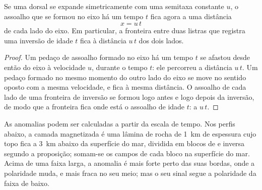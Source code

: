 \begin{proposition}\label{prop:g11:drift-to-spreading:stripe}
Se uma dorsal se expande simetricamente com uma semitaxa constante $u$, o
assoalho que se formou no eixo há um tempo $t$ fica agora a uma distância
\[
  x = u\,t
\]
de cada lado do eixo. Em particular, a fronteira entre duas listras que
registra uma inversão de idade $t$ fica à distância $u\,t$ dos dois lados.
\end{proposition}

\begin{proof}
Um pedaço de assoalho formado no eixo há um tempo $t$ se afastou desde então
do eixo à velocidade $u$, durante o tempo $t$: ele percorreu a distância
$u\,t$. Um pedaço formado no mesmo momento do outro lado do eixo se move no
sentido oposto com a mesma velocidade, e fica à mesma distância. O assoalho
de cada lado de uma fronteira de inversão se formou logo antes e logo depois
da inversão, de modo que a fronteira fica onde está o assoalho de idade $t$:
a $u\,t$.
\end{proof}

As anomalias podem ser calculadas a partir da escala de tempo. Nos perfis
abaixo, a camada magnetizada é uma lâmina de rocha de \qty{1}{km} de
espessura cujo topo fica a \qty{3}{km} abaixo da superfície do mar, dividida
em blocos de  e inversa segundo a proposição; somam-se os
campos de cada bloco na superfície do mar. Acima de uma faixa larga, a
anomalia é mais forte perto das suas bordas, onde a polaridade muda, e mais
fraca no seu meio; mas o seu sinal segue a polaridade da faixa de baixo.

